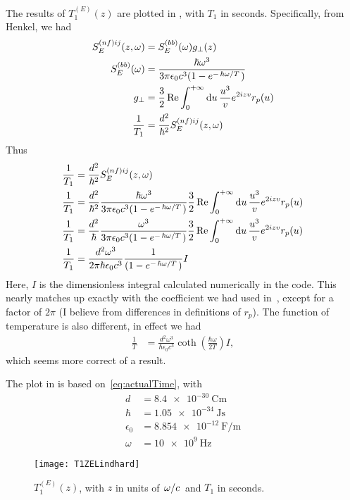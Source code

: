 \documentclass[../main.tex]{subfiles}
\begin{document}
	The results of $T_1^{(E)}(z)$ are plotted in , with $T_1$ in seconds.
	Specifically, from Henkel\supercite{Henkel1999}, we had
	\begin{align}
		S^{(nf)ij}_E(z, \omega) &= S^{(bb)}_E(\omega) g_{\perp}(z) \\
		S^{(bb)}_E(\omega) &= \frac{\hbar \omega^3}{3 \pi \epsilon_0 c^3 (1 - e^{-\flatfrac{\hbar \omega}{T}})} \\
		g_\perp &= \frac32 \Re \int_0^{+\infty} \dd{u} \frac{u^3}{v} e^{2 i z v} r_p(u) \\
		\frac{1}{T_1} &= \frac{d^2}{\hbar^2} S^{(nf)ij}_E(z, \omega)
	\end{align}
	Thus
	\begin{align}
		\frac{1}{T_1} &= \frac{d^2}{\hbar^2} S^{(nf)ij}_E(z, \omega) \\
		\frac{1}{T_1} &= \frac{d^2}{\hbar^2} \frac{\hbar \omega^3}{3 \pi \epsilon_0 c^3 (1 - e^{-\flatfrac{\hbar \omega}{T}})} \frac32 \Re \int_0^{+\infty} \dd{u} \frac{u^3}{v} e^{2 i z v} r_p(u) \\
		\frac{1}{T_1} &= \frac{d^2}{\hbar} \frac{\omega^3}{3 \pi \epsilon_0 c^3 (1 - e^{-\flatfrac{\hbar \omega}{T}})} \frac32 \Re \int_0^{+\infty} \dd{u} \frac{u^3}{v} e^{2 i z v} r_p(u) \\
		\frac{1}{T_1} &= \frac{d^2 \omega^3}{2 \pi \hbar \epsilon_0 c^3} \frac{1}{(1 - e^{-\flatfrac{\hbar \omega}{T}})} I
	\end{align}
	Here, $I$ is the dimensionless integral calculated numerically in the code.
	This nearly matches up exactly with the coefficient we had used in~\cite{QubitRelax}, except for a factor of $2\pi$ (I believe from differences in definitions of $r_p$).
	The function of temperature is also different, in effect we had
	\begin{align}
		\frac{1}{T} &= \frac{d^2 \omega^3}{\hbar \epsilon_0 c^3} \coth(\frac{\hbar \omega}{2 T}) I, \label{eq:actualTime}
	\end{align}
	which seems more correct of a result.

	The plot in  is based on~\eqref{eq:actualTime}, with
	\begin{align}
		d &= \SI{8.4e-30}{\coulomb \meter} \\
		\hbar &= \SI{1.05e-34}{\J \s} \\
		\epsilon_0 &= \SI{8.854e-12}{\farad\per\meter} \\
		\omega &= \SI{10e9}{\Hz}
	\end{align}
	\begin{figure}[htp]
		\centering
		\texttt{[image: T1ZELindhard]}
		\caption{$T_{1}^{(E)}(z)$, with $z$ in units of $\flatfrac{\omega}{c}$ and $T_1$ in seconds.}\label{fig:t1ez}
	\end{figure}
\end{document}
